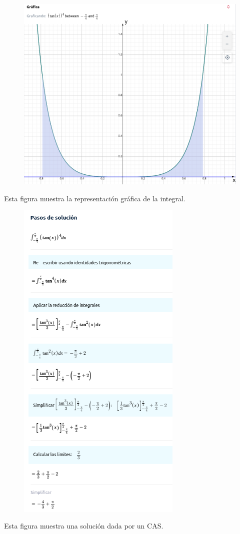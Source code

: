 \documentclass[12pt]{article}
\begin{document}
\begin{enumerate}[label=(\alph*)]
  \begin{figure}[H]
       \centering
       \includegraphics[width=1\textwidth]{../img/img_Lista4/CAS_g.png}
  \end{figure}
  Esta figura muestra la representación gráfica de la integral.
  \begin{figure}[H]
       \centering
       \includegraphics[width=0.7\textwidth]{../img/img_Lista4/CAS.png}
  \end{figure}
  Esta figura muestra una solución dada por un CAS. 
  

\end{enumerate}
\end{document}
